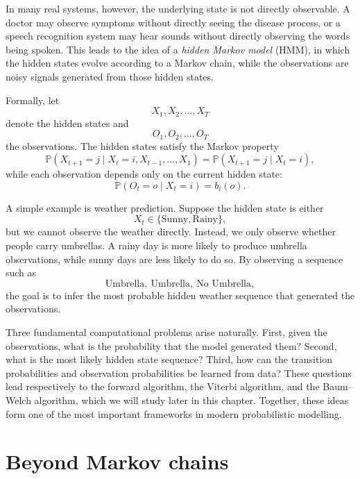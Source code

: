 \medskip

In many real systems, however, the underlying state is not directly observable. A doctor may observe symptoms without directly seeing the disease process, or a speech recognition system may hear sounds without directly observing the words being spoken. This leads to the idea of a \textit{hidden Markov model} (HMM), in which the hidden states evolve according to a Markov chain, while the observations are noisy signals generated from those hidden states.

\medskip

Formally, let
\[
    X_1, X_2, \dots, X_T
\]
denote the hidden states and
\[
    O_1, O_2, \dots, O_T
\]
the observations. The hidden states satisfy the Markov property
\[
    \mathbb{P}(X_{t+1}=j \mid X_t=i, X_{t-1},\dots,X_1) = \mathbb{P}(X_{t+1}=j \mid X_t=i),
\]
while each observation depends only on the current hidden state:
\[
    \mathbb{P}(O_t=o \mid X_t=i)=b_i(o).
\]

\medskip

A simple example is weather prediction. Suppose the hidden state is either
\[
    X_t \in \{\text{Sunny},\text{Rainy}\},
\]
but we cannot observe the weather directly. Instead, we only observe whether people carry umbrellas. A rainy day is more likely to produce umbrella observations, while sunny days are less likely to do so. By observing a sequence such as
\[
    \text{Umbrella},\ \text{Umbrella},\ \text{No Umbrella},
\]
the goal is to infer the most probable hidden weather sequence that generated the observations.

\medskip

Three fundamental computational problems arise naturally. First, given the observations, what is the probability that the model generated them? Second, what is the most likely hidden state sequence? Third, how can the transition probabilities and observation probabilities be learned from data? These questions lead respectively to the forward algorithm, the Viterbi algorithm, and the Baum--Welch algorithm, which we will study later in this chapter. Together, these ideas form one of the most important frameworks in modern probabilistic modelling.

\section{Beyond Markov chains}

